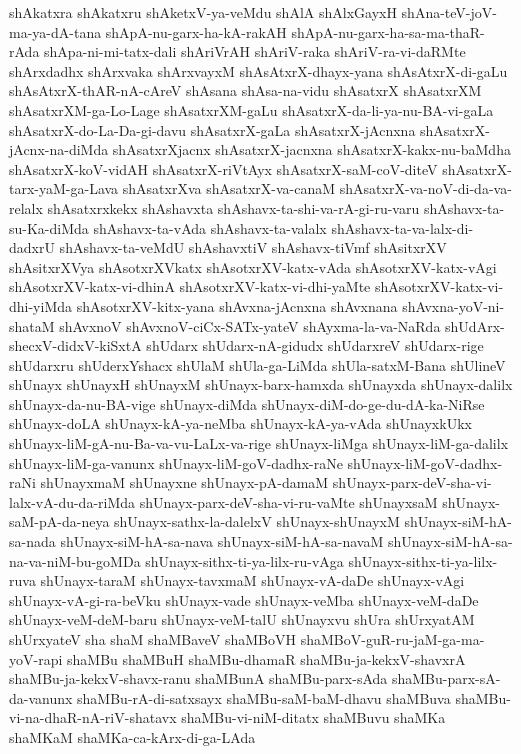 {shAkatxra
shAkatxru
shAketxV-ya-veMdu
shAlA
shAlxGayxH
shAna-teV-joV-ma-ya-dA-tana
shApA-nu-garx-ha-kA-rakAH
shApA-nu-garx-ha-sa-ma-thaR-rAda
shApa-ni-mi-tatx-dali
shAriVrAH
shAriV-raka
shAriV-ra-vi-daRMte
shArxdadhx
shArxvaka
shArxvayxM
shAsAtxrX-dhayx-yana
shAsAtxrX-di-gaLu
shAsAtxrX-thAR-nA-cAreV
shAsana
shAsa-na-vidu
shAsatxrX
shAsatxrXM
shAsatxrXM-ga-Lo-Lage
shAsatxrXM-gaLu
shAsatxrX-da-li-ya-nu-BA-vi-gaLa
shAsatxrX-do-La-Da-gi-davu
shAsatxrX-gaLa
shAsatxrX-jAcnxna
shAsatxrX-jAcnx-na-diMda
shAsatxrXjacnx
shAsatxrX-jacnxna
shAsatxrX-kakx-nu-baMdha
shAsatxrX-koV-vidAH
shAsatxrX-riVtAyx
shAsatxrX-saM-coV-diteV
shAsatxrX-tarx-yaM-ga-Lava
shAsatxrXva
shAsatxrX-va-canaM
shAsatxrX-va-noV-di-da-va-relalx
shAsatxrxkekx
shAshavxta
shAshavx-ta-shi-va-rA-gi-ru-varu
shAshavx-ta-su-Ka-diMda
shAshavx-ta-vAda
shAshavx-ta-valalx
shAshavx-ta-va-lalx-di-dadxrU
shAshavx-ta-veMdU
shAshavxtiV
shAshavx-tiVmf
shAsitxrXV
shAsitxrXVya
shAsotxrXVkatx
shAsotxrXV-katx-vAda
shAsotxrXV-katx-vAgi
shAsotxrXV-katx-vi-dhinA
shAsotxrXV-katx-vi-dhi-yaMte
shAsotxrXV-katx-vi-dhi-yiMda
shAsotxrXV-kitx-yana
shAvxna-jAcnxna
shAvxnana
shAvxna-yoV-ni-shataM
shAvxnoV
shAvxnoV-ciCx-SATx-yateV
shAyxma-la-va-NaRda
shUdArx-shecxV-didxV-kiSxtA
shUdarx
shUdarx-nA-gidudx
shUdarxreV
shUdarx-rige
shUdarxru
shUderxYshacx
shUlaM
shUla-ga-LiMda
shUla-satxM-Bana
shUlineV
shUnayx
shUnayxH
shUnayxM
shUnayx-barx-hamxda
shUnayxda
shUnayx-dalilx
shUnayx-da-nu-BA-vige
shUnayx-diMda
shUnayx-diM-do-ge-du-dA-ka-NiRse
shUnayx-doLA
shUnayx-kA-ya-neMba
shUnayx-kA-ya-vAda
shUnayxkUkx
shUnayx-liM-gA-nu-Ba-va-vu-LaLx-va-rige
shUnayx-liMga
shUnayx-liM-ga-dalilx
shUnayx-liM-ga-vanunx
shUnayx-liM-goV-dadhx-raNe
shUnayx-liM-goV-dadhx-raNi
shUnayxmaM
shUnayxne
shUnayx-pA-damaM
shUnayx-parx-deV-sha-vi-lalx-vA-du-da-riMda
shUnayx-parx-deV-sha-vi-ru-vaMte
shUnayxsaM
shUnayx-saM-pA-da-neya
shUnayx-sathx-la-dalelxV
shUnayx-shUnayxM
shUnayx-siM-hA-sa-nada
shUnayx-siM-hA-sa-nava
shUnayx-siM-hA-sa-navaM
shUnayx-siM-hA-sa-na-va-niM-bu-goMDa
shUnayx-sithx-ti-ya-lilx-ru-vAga
shUnayx-sithx-ti-ya-lilx-ruva
shUnayx-taraM
shUnayx-tavxmaM
shUnayx-vA-daDe
shUnayx-vAgi
shUnayx-vA-gi-ra-beVku
shUnayx-vade
shUnayx-veMba
shUnayx-veM-daDe
shUnayx-veM-deM-baru
shUnayx-veM-talU
shUnayxvu
shUra
shUrxyatAM
shUrxyateV
sha
shaM
shaMBaveV
shaMBoVH
shaMBoV-guR-ru-jaM-ga-ma-yoV-rapi
shaMBu
shaMBuH
shaMBu-dhamaR
shaMBu-ja-kekxV-shavxrA
shaMBu-ja-kekxV-shavx-ranu
shaMBunA
shaMBu-parx-sAda
shaMBu-parx-sA-da-vanunx
shaMBu-rA-di-satxsayx
shaMBu-saM-baM-dhavu
shaMBuva
shaMBu-vi-na-dhaR-nA-riV-shatavx
shaMBu-vi-niM-ditatx
shaMBuvu
shaMKa
shaMKaM
shaMKa-ca-kArx-di-ga-LAda
}
